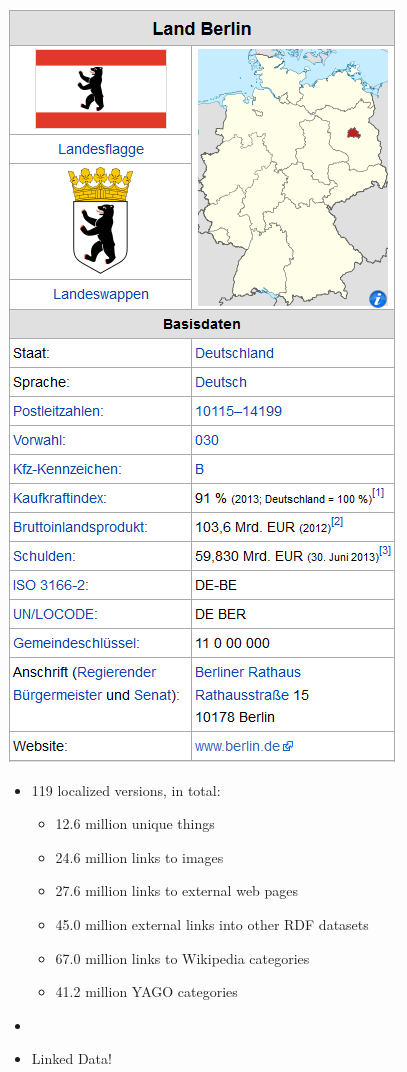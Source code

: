 \begin{frame}
\begin{minipage}{0.25\textwidth}
\includegraphics[scale=0.25]{img/berlin.png}
\end{minipage}
\end{frame}

\begin{frame}
\begin{itemize}
  \item 119 localized versions, in total:
  \begin{itemize}
    \item  12.6 million unique things
    \item 24.6 million links to images
    \item 27.6 million links to external web
    pages
    \item 45.0 million external links into other RDF datasets
    \item 67.0 million links to Wikipedia categories
    \item 41.2 million YAGO categories
  \end{itemize}
  \item
  \item Linked Data!
\end{itemize}
\end{frame}

